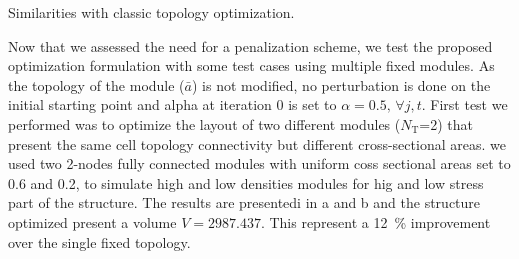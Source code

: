 Similarities with classic topology optimization. 

Now that we assessed the need for a penalization scheme, we test the proposed optimization formulation with some test cases using multiple fixed modules. As the topology of the module ($\bar{a}$) is not modified, no perturbation is done on the initial starting point and alpha at iteration 0 is set to $\alpha = 0.5,\,\forall j,t $. First test we performed was to optimize the layout of two different modules ($N_\text{T}$=2) that present the same cell topology connectivity but different cross-sectional areas. we used two 2-nodes fully connected modules with uniform coss sectional areas set to 0.6 and 0.2, to simulate high and low densities modules for hig and low stress part of the structure. The results are presentedi in a and b and the structure optimized present a volume $V = 2987.437$. This represent a \qty{12}{\percent} improvement over the single fixed topology.
\begin{figure}
    \hspace*{\fill}
    \hfill
    \hspace*{\fill}

    \bigskip

    \hspace*{\fill}
    \hfill
    \hspace*{\fill}
    \caption{}
    \label{fig:06_multiple_fixed}
\end{figure}

